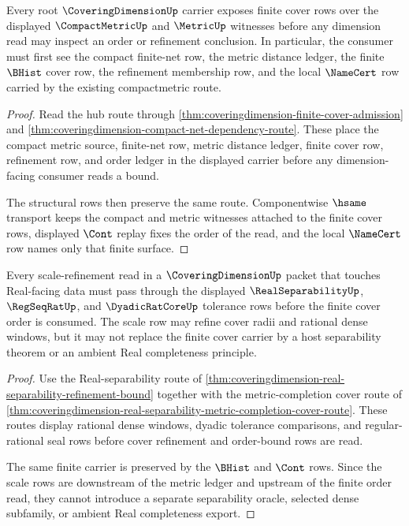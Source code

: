 \begin{theorem}
\label{thm:coveringdimension-finite-cover-carrier-obligation}
Every root $\CoveringDimensionUp$ carrier exposes finite cover rows over the displayed $\CompactMetricUp$ and $\MetricUp$ witnesses before any dimension read may inspect an order or refinement conclusion. In particular, the consumer must first see the compact finite-net row, the metric distance ledger, the finite $\BHist$ cover row, the refinement membership row, and the local $\NameCert$ row carried by the existing compactmetric route.
\end{theorem}
\begin{proof}
Read the hub route through \autoref{thm:coveringdimension-finite-cover-admission} and \autoref{thm:coveringdimension-compact-net-dependency-route}. These place the compact metric source, finite-net row, metric distance ledger, finite cover row, refinement row, and order ledger in the displayed carrier before any dimension-facing consumer reads a bound.

The structural rows then preserve the same route. Componentwise $\hsame$ transport keeps the compact and metric witnesses attached to the finite cover rows, displayed $\Cont$ replay fixes the order of the read, and the local $\NameCert$ row names only that finite surface.
\end{proof}

\begin{theorem}
\label{thm:coveringdimension-real-separability-scale-obligation}
Every scale-refinement read in a $\CoveringDimensionUp$ packet that touches Real-facing data must pass through the displayed $\RealSeparabilityUp$, $\RegSeqRatUp$, and $\DyadicRatCoreUp$ tolerance rows before the finite cover order is consumed. The scale row may refine cover radii and rational dense windows, but it may not replace the finite cover carrier by a host separability theorem or an ambient Real completeness principle.
\end{theorem}
\begin{proof}
Use the Real-separability route of \autoref{thm:coveringdimension-real-separability-refinement-bound} together with the metric-completion cover route of \autoref{thm:coveringdimension-real-separability-metric-completion-cover-route}. These routes display rational dense windows, dyadic tolerance comparisons, and regular-rational seal rows before cover refinement and order-bound rows are read.

The same finite carrier is preserved by the $\BHist$ and $\Cont$ rows. Since the scale rows are downstream of the metric ledger and upstream of the finite order read, they cannot introduce a separate separability oracle, selected dense subfamily, or ambient Real completeness export.
\end{proof}

